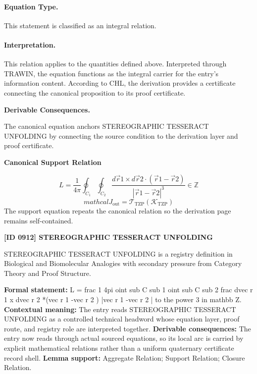 \paragraph{Equation Type.}
This statement is classified as an integral relation.

\paragraph{Interpretation.}
This relation applies to the quantities defined above. Interpreted through TRAWIN, the equation functions as the integral carrier for the entry’s information content. According to CHL, the derivation provides a certificate connecting the canonical proposition to its proof certificate.

\par\vspace{0.35em}
\noindent\textbf{Derivable Consequences.}\quad
\begingroup
\footnotesize
\raggedright
The canonical equation anchors STEREOGRAPHIC TESSERACT UNFOLDING by connecting the source condition to the derivation layer and proof certificate.
\par\endgroup

\noindent\textbf{Canonical Support Relation}\par
\[
L = \frac{1}{4\pi}\oint_{C_{1}}\oint_{C_{2}}\frac{d\vec{r} {1}\times d\vec{r} {2}\cdot(\vec{r} {1}-\vec{r} {2})}{|\vec{r} {1}-\vec{r} {2}|^{3}} \in \mathbb{Z}
\]
\[
mathcal{J}_{\mathrm{out}} = \mathcal{T}_{\mathrm{TZP}}\!\left(\mathcal{K}_{\mathrm{TZP}}\right)
\]
\noindent The support equation repeats the canonical relation so the derivation page remains self-contained.\par

\clearpage
\noindent\textbf{[ID 0912] STEREOGRAPHIC TESSERACT UNFOLDING}\par
\vspace{0.35em}
\begingroup\small
{}
STEREOGRAPHIC TESSERACT UNFOLDING is a registry definition in Biological and Biomolecular Analogies with secondary pressure from Category Theory and Proof Structure.

\begingroup\footnotesize\setlength{\emergencystretch}{3em}\sloppy
\textbf{Formal statement:} L = frac 1 4pi oint sub C sub 1 oint sub C sub 2 frac dvec r 1 x dvec r 2 *(vec r 1 -vec r 2 ) |vec r 1 -vec r 2 | to the power 3 in mathbb Z. \textbf{Contextual meaning:} The entry reads STEREOGRAPHIC TESSERACT UNFOLDING as a controlled technical headword whose equation layer, proof route, and registry role are interpreted together. \textbf{Derivable consequences:} The entry now reads through actual sourced equations, so its local arc is carried by explicit mathematical relations rather than a uniform quaternary certificate record shell. \textbf{Lemma support:} Aggregate Relation; Support Relation; Closure Relation.\par
\endgroup

